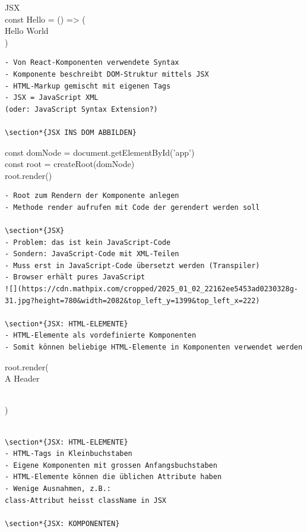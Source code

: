\documentclass[10pt]{article}
\begin{document}
JSX\\
const Hello = () => (\\
Hello World\\
)

\begin{verbatim}
- Von React-Komponenten verwendete Syntax
- Komponente beschreibt DOM-Struktur mittels JSX
- HTML-Markup gemischt mit eigenen Tags
- JSX = JavaScript XML
(oder: JavaScript Syntax Extension?)

\section*{JSX INS DOM ABBILDEN}
\end{verbatim}

const domNode = document.getElementById('app')\\
const root = createRoot(domNode)\\
root.render()

\begin{verbatim}
- Root zum Rendern der Komponente anlegen
- Methode render aufrufen mit Code der gerendert werden soll

\section*{JSX}
- Problem: das ist kein JavaScript-Code
- Sondern: JavaScript-Code mit XML-Teilen
- Muss erst in JavaScript-Code übersetzt werden (Transpiler)
- Browser erhält pures JavaScript
![](https://cdn.mathpix.com/cropped/2025_01_02_22162ee5453ad0230328g-31.jpg?height=780&width=2082&top_left_y=1399&top_left_x=222)

\section*{JSX: HTML-ELEMENTE}
- HTML-Elemente als vordefinierte Komponenten
- Somit können beliebige HTML-Elemente in Komponenten verwendet werden
\end{verbatim}

root.render(\\


A Header

\\
)

\begin{verbatim}

\section*{JSX: HTML-ELEMENTE}
- HTML-Tags in Kleinbuchstaben
- Eigene Komponenten mit grossen Anfangsbuchstaben
- HTML-Elemente können die üblichen Attribute haben
- Wenige Ausnahmen, z.B.:
class-Attribut heisst className in JSX

\section*{JSX: KOMPONENTEN}
\end{verbatim}
\end{document}
